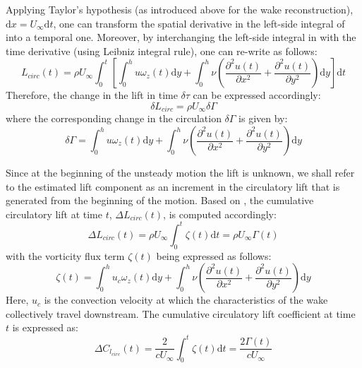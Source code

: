 \documentclass[12pt,a4paper]{article}
\begin{document}
\newpage
Applying Taylor's hypothesis (as introduced above for the wake reconstruction), $\mathrm{d} x = U_\infty \mathrm{d}t$, one can transform the spatial derivative in the left-side integral of  into a temporal one. 
Moreover, by interchanging the left-side integral in  with the time derivative (using Leibniz integral rule), one can re-write  as follows:
\begin{equation}
L_{circ}(t) = \rho U_\infty \int_0^t \left[ \int_0^h u\omega_z(t)\mathrm{d}y +  \int_0^h\nu \left( \frac{\partial^2u(t)}{\partial x^2} + \frac{\partial^2u(t)}{\partial y^2} \right)\mathrm{d}y \right] \mathrm{d}t
\label{eq:inst_Lift2}
\end{equation}
Therefore, the change in the lift in time $\delta\tau$ can be expressed accordingly:
\begin{equation}
\delta L_{circ} = \rho U_\infty  \delta\Gamma
\label{eq:delL}
\end{equation}
where the corresponding change in the circulation $\delta \Gamma$ is given by:
\begin{equation}
\delta\Gamma =  \int_0^h u\omega_z(t)\mathrm{d}y +  \int_0^h\nu \left( \frac{\partial^2u(t)}{\partial x^2} + \frac{\partial^2u(t)}{\partial y^2} \right)\mathrm{d}y
\label{eq:delGamma}
\end{equation}

Since at the beginning of the unsteady motion the lift is unknown, we shall refer to the estimated lift component as an increment in the circulatory lift \cite{Stalnov2015,BenGida2016} that is generated from the beginning of the motion. 
Based on , the cumulative circulatory lift at time $t$, $\Delta L_{circ}(t)$, is computed accordingly:
\begin{equation}
\Delta L_{circ} (t)= \rho U_\infty \int_0^t \zeta(t)\mathrm{d}t = \rho U_\infty \Gamma(t)
\label{eq:dL-circ}
\end{equation}
with the vorticity flux term $\zeta(t)$ being expressed as follows:
\begin{equation}
\zeta(t) = \int_0^h u_c\omega_z(t)\mathrm{d}y +  \int_0^h\nu \left( \frac{\partial^2u(t)}{\partial x^2} + \frac{\partial^2u(t)}{\partial y^2} \right)\mathrm{d}y
\label{eq:zeta_vs_time}
\end{equation}
Here, $u_c$ is the convection velocity at which the characteristics of the wake collectively travel downstream.
The cumulative circulatory lift coefficient at time $t$ is expressed as:
\begin{equation}
\Delta C_{l_{circ}}(t) = \frac{2}{cU_\infty} \int_0^t \zeta(t)\mathrm{d}t = \frac{2\Gamma(t)}{cU_\infty}
\label{eq:dCl-circ}
\end{equation}
\end{document}
